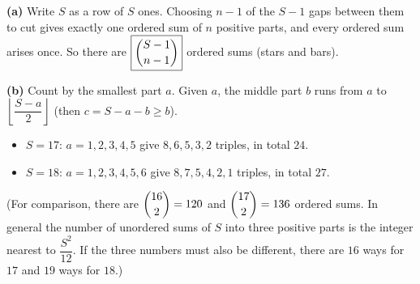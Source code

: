 \textbf{(a)} Write $S$ as a row of $S$ ones. Choosing $n-1$ of the $S-1$ gaps between them to cut gives exactly one ordered sum of $n$ positive parts, and every ordered sum arises once. So there are $\boxed{\dbinom{S-1}{n-1}}$ ordered sums (stars and bars).

\textbf{(b)} Count by the smallest part $a$. Given $a$, the middle part $b$ runs from $a$ to $\left\lfloor\dfrac{S-a}{2}\right\rfloor$ (then $c=S-a-b\ge b$).
\begin{itemize}
\item $S=17$: $a=1,2,3,4,5$ give $8,6,5,3,2$ triples, in total $\boxed{24}$.
\item $S=18$: $a=1,2,3,4,5,6$ give $8,7,5,4,2,1$ triples, in total $\boxed{27}$.
\end{itemize}
(For comparison, there are $\dbinom{16}{2}=120$ and $\dbinom{17}{2}=136$ ordered sums. In general the number of unordered sums of $S$ into three positive parts is the integer nearest to $\dfrac{S^2}{12}$. If the three numbers must also be different, there are $16$ ways for $17$ and $19$ ways for $18$.)
